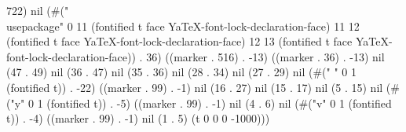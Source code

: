 722) nil (#("\\usepackage{}" 0 11 (fontified t face YaTeX-font-lock-declaration-face) 11 12 (fontified t face YaTeX-font-lock-declaration-face) 12 13 (fontified t face YaTeX-font-lock-declaration-face)) . 36) ((marker . 516) . -13) ((marker . 36) . -13) nil (47 . 49) nil (36 . 47) nil (35 . 36) nil (28 . 34) nil (27 . 29) nil (#(" " 0 1 (fontified t)) . -22) ((marker . 99) . -1) nil (16 . 27) nil (15 . 17) nil (5 . 15) nil (#("y" 0 1 (fontified t)) . -5) ((marker . 99) . -1) nil (4 . 6) nil (#("v" 0 1 (fontified t)) . -4) ((marker . 99) . -1) nil (1 . 5) (t 0 0 0 -1000)))

